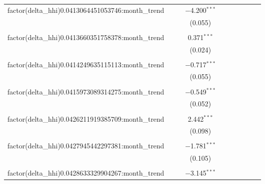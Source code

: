 \begin{table}[H]
{\begin{tabular}{@{\extracolsep{5pt}}lccccccccc}
  factor(delta\_hhi)0.0413064451053746:month\_trend &  &  & $-$4.200$^{***}$ &  &  &  &  &  &  \\  

   &  &  & (0.055) &  &  &  &  &  &  \\  

   & & & & & & & & & \\  

  factor(delta\_hhi)0.0413660351758378:month\_trend &  &  & 0.371$^{***}$ &  &  &  &  &  &  \\  

   &  &  & (0.024) &  &  &  &  &  &  \\  

   & & & & & & & & & \\  

  factor(delta\_hhi)0.0414249635115113:month\_trend &  &  & $-$0.717$^{***}$ &  &  &  &  &  &  \\  

   &  &  & (0.055) &  &  &  &  &  &  \\  

   & & & & & & & & & \\  

  factor(delta\_hhi)0.0415973089314275:month\_trend &  &  & $-$0.549$^{***}$ &  &  &  &  &  &  \\  

   &  &  & (0.052) &  &  &  &  &  &  \\  

   & & & & & & & & & \\  

  factor(delta\_hhi)0.0426211919385709:month\_trend &  &  & 2.442$^{***}$ &  &  &  &  &  &  \\  

   &  &  & (0.098) &  &  &  &  &  &  \\  

   & & & & & & & & & \\  

  factor(delta\_hhi)0.0427945442297381:month\_trend &  &  & $-$1.781$^{***}$ &  &  &  &  &  &  \\  

   &  &  & (0.105) &  &  &  &  &  &  \\  

   & & & & & & & & & \\  

  factor(delta\_hhi)0.0428633329904267:month\_trend &  &  & $-$3.145$^{***}$ &  &  &  &  &  &  \\  


\end{tabular}}
\end{table}
